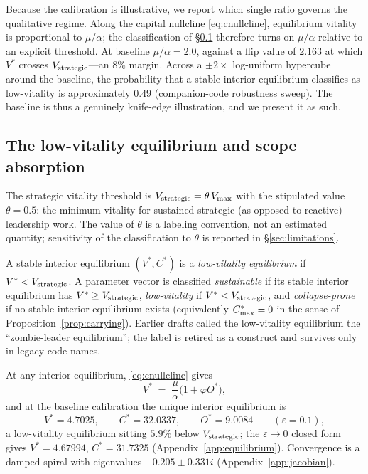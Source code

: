 Because the calibration is illustrative, we report which single ratio governs
the qualitative regime. Along the capital nullcline \eqref{eq:cnullcline},
equilibrium vitality is proportional to $\mu/\alpha$; the classification of
\S\ref{sec:equilibrium-lowvitality} therefore turns on $\mu/\alpha$ relative
to an explicit threshold. At baseline $\mu/\alpha=2.0$, against a flip value
of $2.163$ at which $V^{*}$ crosses $V_{\mathrm{strategic}}$---an $8\%$ margin. Across a
$\pm2\times$ log-uniform hypercube around the baseline, the probability that
a stable interior equilibrium classifies as low-vitality is approximately
$0.49$ (companion-code robustness sweep). The baseline is thus a genuinely
knife-edge illustration, and we present it as such.

\subsection{The low-vitality equilibrium and scope absorption}
\label{sec:equilibrium-lowvitality}

\begin{definition}
\label{def:threshold}
The strategic vitality threshold is $V_{\mathrm{strategic}}=\theta\,V_{\max}$ with the
stipulated value $\theta=0.5$: the minimum vitality for sustained strategic
(as opposed to reactive) leadership work. The value of $\theta$ is a
labeling convention, not an estimated quantity; sensitivity of the
classification to $\theta$ is reported in \S\ref{sec:limitations}.
\end{definition}

\begin{definition}
\label{def:lowvitality}
A stable interior equilibrium $(V^{*},C^{*})$ is a \emph{low-vitality
equilibrium} if $V^{*}<V_{\mathrm{strategic}}$. A parameter vector is classified
\emph{sustainable} if its stable interior equilibrium has
$V^{*}\ge V_{\mathrm{strategic}}$, \emph{low-vitality} if $V^{*}<V_{\mathrm{strategic}}$, and
\emph{collapse-prone} if no stable interior equilibrium exists (equivalently
$C^{*}_{\max}=0$ in the sense of Proposition~\ref{prop:carrying}). Earlier drafts
called the low-vitality equilibrium the ``zombie-leader equilibrium''; the
label is retired as a construct and survives only in legacy code names.
\end{definition}

At any interior equilibrium, \eqref{eq:cnullcline} gives
\begin{equation}
\label{eq:vstar}
V^{*} \;=\; \frac{\mu}{\alpha}\bigl(1+\varphi O^{*}\bigr),
\end{equation}
and at the baseline calibration the unique interior equilibrium is
\[
V^{*}=4.7025,\qquad C^{*}=32.0337,\qquad O^{*}=9.0084
\qquad(\varepsilon=0.1),
\]
a low-vitality equilibrium sitting $5.9\%$ below $V_{\mathrm{strategic}}$; the
$\varepsilon\to0$ closed form gives $V^{*}=4.67994$, $C^{*}=31.7325$
(Appendix~\ref{app:equilibrium}). Convergence is a damped spiral with
eigenvalues $-0.205\pm0.331i$ (Appendix~\ref{app:jacobian}).

